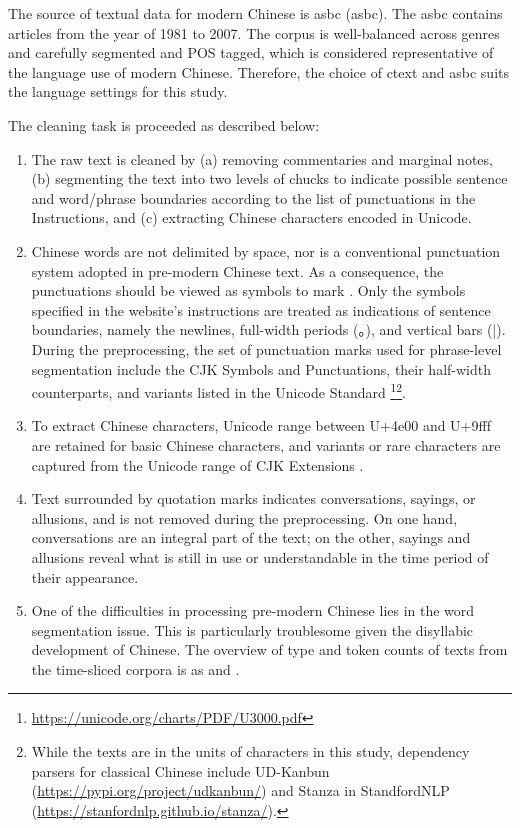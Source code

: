 The source of textual data for modern Chinese is \acrlong{asbc} (\acrshort{asbc}). The \gls{asbc} contains articles from the year of 1981 to 2007. The corpus is well-balanced across genres and carefully segmented and POS tagged, which is considered representative of the language use of modern Chinese. Therefore, the choice of \gls{ctext} and \gls{asbc} suits the language settings for this study.

The cleaning task is proceeded as described below:

\begin{enumerate}[label={(\arabic*)},nolistsep]
    \item The raw text is cleaned by (a) removing commentaries and marginal notes, (b) segmenting the text into two levels of chucks to indicate possible sentence and word/phrase boundaries according to the list of punctuations in the Instructions, and (c) extracting Chinese characters encoded in Unicode.
    \item Chinese words are not delimited by space, nor is a conventional punctuation system adopted in pre-modern Chinese text. As a consequence, the punctuations  should be viewed as symbols to mark . Only the symbols specified in the website's instructions are treated as indications of sentence boundaries, namely the newlines, full-width periods (。), and vertical bars (|). During the preprocessing, the set of punctuation marks used for phrase-level segmentation include the CJK Symbols and Punctuations, their half-width counterparts, and variants listed in the Unicode Standard \footnote{\url{https://unicode.org/charts/PDF/U3000.pdf}}\footnote{While the texts are in the units of characters in this study, dependency parsers for classical Chinese include UD-Kanbun \parencite{yasuoka2019universal} (\url{https://pypi.org/project/udkanbun/}) and Stanza in StandfordNLP \parencite{qi2020stanza}(\url{https://stanfordnlp.github.io/stanza/}).}.
    \item To extract Chinese characters, Unicode range between U+4e00 and U+9fff are retained for basic Chinese characters, and variants or rare characters are captured from the Unicode range of CJK Extensions \parencite{moran2018unicode}.
    \item Text surrounded by quotation marks indicates conversations, sayings, or allusions, and is not removed during the preprocessing. On one hand, conversations are an integral part of the text; on the other, sayings and allusions reveal what is still in use or understandable in the time period of their appearance.
    \item One of the difficulties in processing pre-modern Chinese lies in the word segmentation issue. This is particularly troublesome given the disyllabic development of Chinese. The overview of type and token counts of texts from the time-sliced corpora is as  and .
\end{enumerate}
\vspace*{\baselineskip}

